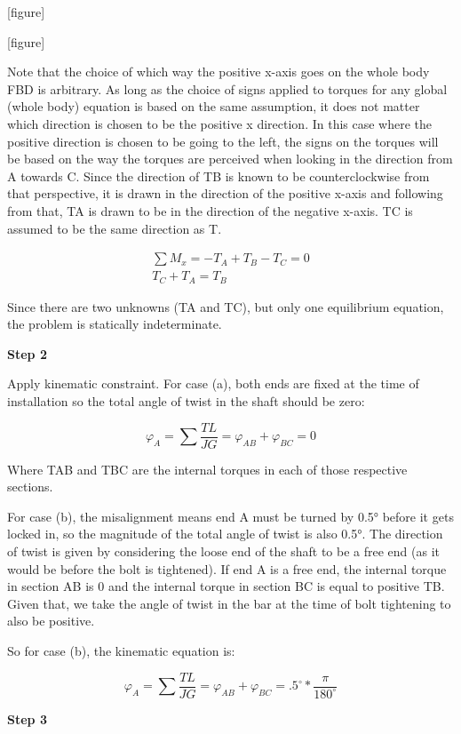 \documentclass[
  letterpaper,
  DIV=11,
  numbers=noendperiod]{scrreprt}
\begin{document}
\begin{tcolorbox}
\begin{tcolorbox}
{[}figure{]}

{[}figure{]}

Note that the choice of which way the positive x-axis goes on the whole
body FBD is arbitrary. As long as the choice of signs applied to torques
for any global (whole body) equation is based on the same assumption, it
does not matter which direction is chosen to be the positive x
direction. In this case where the positive direction is chosen to be
going to the left, the signs on the torques will be based on the way the
torques are perceived when looking in the direction from A towards C.
Since the direction of TB is known to be counterclockwise from that
perspective, it is drawn in the direction of the positive x-axis and
following from that, TA is drawn to be in the direction of the negative
x-axis. TC is assumed to be the same direction as T.

\[
\begin{gathered}
\sum M_x=-T_A+T_B-T_C=0 \\
T_C+T_A=T_B
\end{gathered}
\]

Since there are two unknowns (TA and TC), but only one equilibrium
equation, the problem is statically indeterminate.

\textbf{Step 2}

Apply kinematic constraint. For case (a), both ends are fixed at the
time of installation so the total angle of twist in the shaft should be
zero:

\[
\varphi_A=\sum \frac{T L}{J G}=\varphi_{A B}+\varphi_{B C}=0
\]

Where TAB and TBC are the internal torques in each of those respective
sections.

For case (b), the misalignment means end A must be turned by 0.5° before
it gets locked in, so the magnitude of the total angle of twist is also
0.5°. The direction of twist is given by considering the loose end of
the shaft to be a free end (as it would be before the bolt is
tightened). If end A is a free end, the internal torque in section AB is
0 and the internal torque in section BC is equal to positive TB. Given
that, we take the angle of twist in the bar at the time of bolt
tightening to also be positive.

So for case (b), the kinematic equation is:

\[
\varphi_A=\sum \frac{T L}{J G}=\varphi_{A B}+\varphi_{B C}=.5^{\circ} * \frac{\pi}{180^{\circ}}
\]

\textbf{Step 3}


\end{tcolorbox}
\end{tcolorbox}
\end{document}
